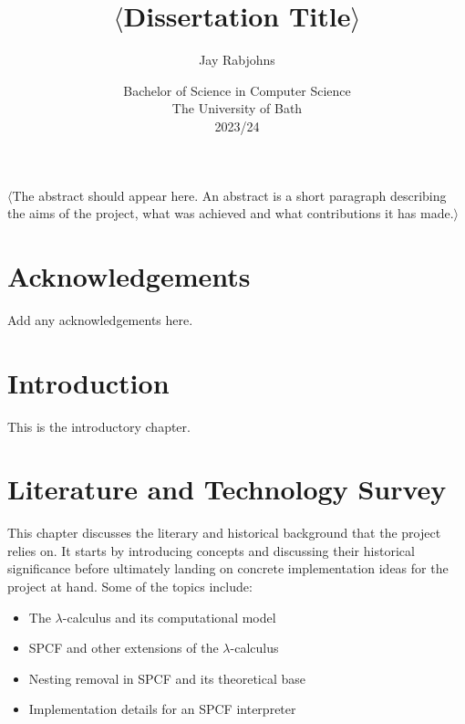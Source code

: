 \documentclass[12pt,a4paper]{report}
\title{\bf $\langle$Dissertation Title$\rangle$}
\author{Jay Rabjohns}
\date{Bachelor of Science in Computer Science\\ 
      The University of Bath\\
      2023/24}
\theoremstyle{definition}
\theoremstyle{remark}
\begin{document}
\hypersetup{pageanchor=false}

\lstset{language=Haskell,breaklines,breakatwhitespace,basicstyle=\small}

\setcounter{page}{0}

\maketitle
\newpage

\newpage

\hypersetup{pageanchor=true}
\abstract
$\langle$The abstract should appear here. An abstract is a short paragraph describing the aims of the project, what was achieved and what contributions it has made.$\rangle$
\newpage

\tableofcontents
\newpage



\chapter*{Acknowledgements}
Add any acknowledgements here.

\newpage
\setcounter{page}{1}

\chapter{Introduction}
This is the introductory chapter.

\chapter{Literature and Technology Survey}
This chapter discusses the literary and historical background that the project relies on. It starts by introducing concepts and discussing their historical significance before ultimately landing on concrete implementation ideas for the project at hand. Some of the topics include:
\begin{itemize}
    \item The $\lambda$-calculus and its computational model
    \item SPCF and other extensions of the $\lambda$-calculus
    \item Nesting removal in SPCF and its theoretical base
    \item Implementation details for an SPCF interpreter
\end{itemize}
\end{document}
